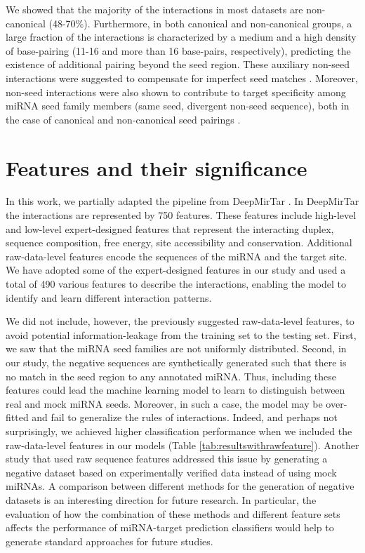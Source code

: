 We showed that the majority of the interactions in most datasets are non-canonical (48-70\%). Furthermore, in both canonical and non-canonical groups, a large fraction of the interactions is characterized by a medium and a high density of base-pairing (11-16 and more than 16 base-pairs, respectively), predicting the existence of additional pairing beyond the seed region. These auxiliary non-seed interactions were suggested to compensate for imperfect seed matches \cite{brennecke2005principles, grimson2007microrna}. Moreover, non-seed interactions were also shown to contribute to target specificity among miRNA seed family members (same seed, divergent non-seed sequence), both in the case of canonical and non-canonical seed pairings \cite{broughton2016pairing, darnell_moore2015mirna}.


\section{Features and their significance}
In this work, we partially adapted the pipeline from DeepMirTar \cite{wen2018deepmirtar}. In DeepMirTar the interactions are represented by 750 features. These features include high-level and low-level expert-designed features that represent the interacting duplex, sequence composition, free energy, site accessibility and conservation. Additional raw-data-level features encode the sequences of the miRNA and the target site. We have adopted some of the expert-designed features in our study and used a total of 490 various features to describe the interactions, enabling the model to identify and learn different interaction patterns. 

We did not include, however, the previously suggested raw-data-level features, to avoid potential information-leakage from the training set to the testing set. First, we saw that the miRNA seed families are not uniformly distributed. Second, in our study, the negative sequences are synthetically generated such that there is no match in the seed region to any annotated miRNA. Thus, including these features could lead the machine learning model to learn to distinguish between real and mock miRNA seeds.  Moreover, in such a case, the model may be over-fitted and fail to generalize the rules of interactions. Indeed, and perhaps not surprisingly, we achieved higher classification performance when we included the raw-data-level features in our models (Table \ref{tab:resultswithrawfeature}). Another study \cite{pla2018miraw} that used raw sequence features addressed this issue by generating a negative dataset based on experimentally verified data instead of using mock miRNAs. A comparison between different methods for the generation of negative datasets is an interesting direction for future research. In particular, the evaluation of how the combination of these methods and different feature sets affects the performance of miRNA-target prediction classifiers would help to generate standard approaches for future studies.

